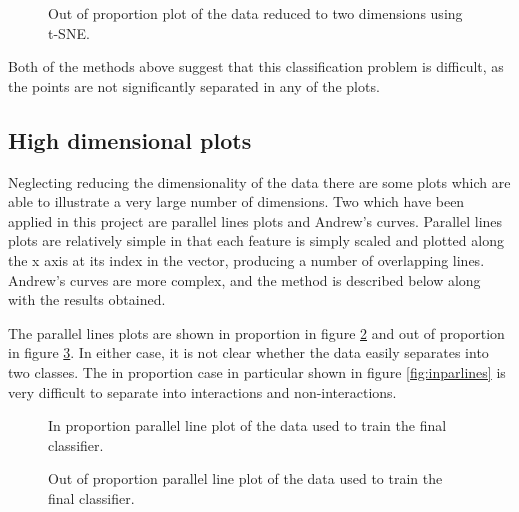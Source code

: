 \begin{figure}
    \setlength\figureheight{3in}
    \setlength\figurewidth{4in}
    \centering
    \caption{Out of proportion plot of the data reduced to two dimensions using t-SNE.}
    \label{fig:outtsne}
\end{figure}

Both of the methods above suggest that this classification problem is difficult, as the points are not significantly separated in any of the plots.

\subsection{High dimensional plots}

Neglecting reducing the dimensionality of the data there are some plots which are able to illustrate a very large number of dimensions.
Two which have been applied in this project are parallel lines plots and Andrew's curves\autocite{andrews_plots_1972}.
Parallel lines plots are relatively simple in that each feature is simply scaled and plotted along the x axis at its index in the vector, producing a number of overlapping lines.
Andrew's curves are more complex, and the method is described below along with the results obtained.

The parallel lines plots are shown in proportion in figure \ref{fig:inparline} and out of proportion in figure \ref{fig:outparline}.
In either case, it is not clear whether the data easily separates into two classes.
The in proportion case in particular shown in figure \ref{fig:inparlines} is very difficult to separate into interactions and non-interactions.

\begin{figure}
    \setlength\figureheight{3in}
    \setlength\figurewidth{4in}
    \centering
    \caption{In proportion parallel line plot of the data used to train the final classifier.}
    \label{fig:inparline}
\end{figure}

\begin{figure}
    \setlength\figureheight{3in}
    \setlength\figurewidth{4in}
    \centering
    \caption{Out of proportion parallel line plot of the data used to train the final classifier.}
    \label{fig:outparline}
\end{figure}

